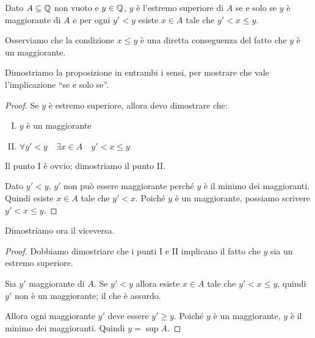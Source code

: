\begin{proposition}
Dato $A \subseteq \mathbb Q$ non vuoto e $y \in \mathbb Q$, $y$ è l'estremo superiore di $A$ se e solo se $y$ è maggiorante di $A$ e per ogni $y' < y$ esiste $x \in A$ tale che $y' < x \le y$.
\end{proposition}

Osserviamo che la condizione $x \le y$ è una diretta conseguenza del fatto che $y$ è un maggiorante.

Dimostriamo la proposizione in entrambi i sensi, per mostrare che vale l'implicazione ``se e solo se''.

\begin{proof}
Se $y$ è estremo superiore, allora devo dimostrare che:
\begin{enumerate}[I.]
\item $y$ è un maggiorante
\item $\forall y' < y \quad \exists x \in A \quad y' < x \le y$
\end{enumerate}
Il punto I è ovvio; dimostriamo il punto II.

Dato $y' < y$, $y'$ non può essere maggiorante perché $y$ è il minimo dei maggioranti. Quindi esiste $x \in A$ tale che $y' < x$. Poiché $y$ è un maggiorante, possiamo scrivere $y' < x \le y$.
\end{proof}

Dimostriamo ora il viceversa.

\begin{proof}
Dobbiamo dimostriare che i punti I e II implicano il fatto che $y$ sia un estremo superiore.

Sia $y'$ maggiorante di $A$. Se $y' < y$ allora esiste $x \in A$ tale che $y' < x \le y$, quindi $y'$ non è un maggiorante; il che è assurdo.

Allora ogni maggiorante $y'$ deve essere $y' \ge y$. Poiché $y$ è un maggiorante, $y$ è il minimo dei maggioranti. Quindi $y = \sup A$.
\end{proof}

